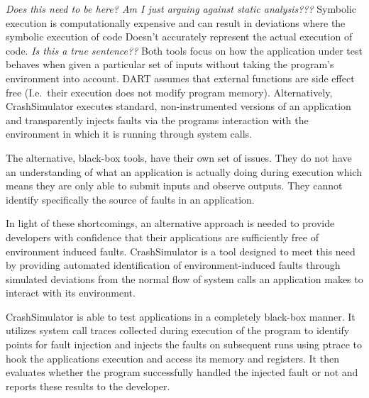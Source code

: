     \emph{Does this need to be here? Am I just arguing against static analysis???} Symbolic execution is computationally
    expensive and can result in deviations where the symbolic execution of code Doesn't accurately represent the actual
    execution of code. \emph{Is this a true sentence??} Both tools focus on how the application under test behaves when
    given a particular set of inputs without taking the program's environment into account. DART assumes that external
    functions are side effect free (I.e.\ their execution does not modify program memory). Alternatively, CrashSimulator
    executes standard, non-instrumented versions of an application and transparently injects faults via the programs
    interaction with the environment in which it is running through system calls.

    The alternative, black-box tools, have their own set of issues. They do not have an understanding of what an
    application is actually doing during execution which means they are only able to submit inputs and observe outputs.
    They cannot identify specifically the source of faults in an application.

    In light of these shortcomings, an alternative approach is needed to provide developers with confidence that their
    applications are sufficiently free of environment induced faults.  CrashSimulator is a tool designed to meet this
    need by providing automated identification of environment-induced faults through simulated deviations from the
    normal flow of system calls an application makes to interact with its environment.

    CrashSimulator is able to test applications in a completely black-box manner. It utilizes system call traces
    collected during execution of the program to identify points for fault injection and injects the faults on
    subsequent runs using ptrace to hook the applications execution and access its memory and registers. It then
    evaluates whether the program successfully handled the injected fault or not and reports these results to the
    developer.


